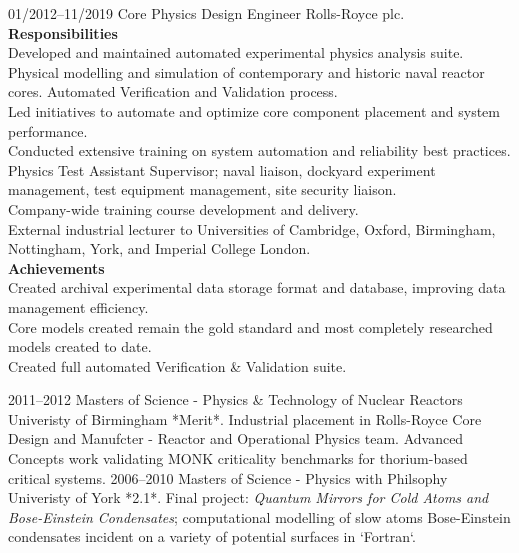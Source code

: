\documentclass[8pt]{developercv}
\begin{document}
\begin{entrylist}
	\entry
	{01/2012--11/2019}
	{Core Physics Design Engineer}
	{Rolls-Royce plc.}
	{
		\textbf{Responsibilities}\\
		Developed and maintained automated experimental physics analysis suite.\\
		Physical modelling and simulation of contemporary and historic naval reactor
		cores. Automated Verification and Validation process.\\
		Led initiatives to automate and optimize core component placement and system
		performance.\\
		Conducted extensive training on system automation and reliability best
		practices.\\
		Physics Test Assistant Supervisor; naval liaison, dockyard experiment
		management, test equipment management, site security liaison.\\
		Company-wide training course development and delivery.\\
		External industrial lecturer to Universities of Cambridge, Oxford,
		Birmingham, Nottingham, York, and Imperial College London.\\

		\textbf{Achievements}\\
		Created archival experimental data storage format and database, improving
		data management efficiency.\\
		Core models created remain the gold standard and most completely researched
		models created to date.\\
		Created full automated Verification \& Validation suite.
	}
\end{entrylist}


\begin{entrylist}
	\entry
	{2011--2012}
	{Masters of Science - Physics \& Technology of Nuclear Reactors}
	{Univeristy of Birmingham}
	{
		*Merit*. Industrial placement in Rolls-Royce Core Design and Manufcter - Reactor
		and Operational Physics team. Advanced Concepts work validating MONK criticality
		benchmarks for thorium-based critical systems.
	}
	\entry
	{2006--2010}
	{Masters of Science - Physics with Philsophy}
	{Univeristy of York}
	{
		*2.1*. Final project: \textit{Quantum Mirrors for Cold Atoms and
			Bose-Einstein Condensates}; computational modelling of slow atoms
		Bose-Einstein condensates incident on a variety of potential surfaces in
		`Fortran`.
	}
\end{entrylist}
\end{document}
